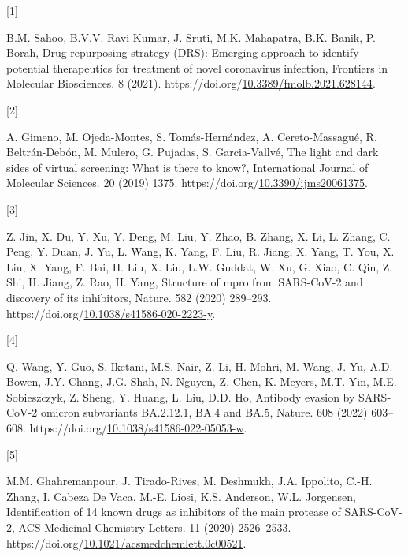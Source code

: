 \documentclass[
]{article}
\newlength{\cslhangindent}
\newlength{\csllabelwidth}
\newlength{\cslentryspacingunit} %
\newenvironment{CSLReferences}[2] %
 {%
  \setlength{\parindent}{0pt}
  \ifodd #1
  \let\oldpar\par
  \def\par{\hangindent=\cslhangindent\oldpar}
  \fi
  \setlength{\parskip}{#2\cslentryspacingunit}
 }%
 {}
\newcommand{\CSLLeftMargin}[1]{\parbox[t]{\csllabelwidth}{#1}}
\newcommand{\CSLRightInline}[1]{\parbox[t]{\linewidth - \csllabelwidth}{#1}\break}
\begin{document}
\hypertarget{refs}{}
\begin{CSLReferences}{0}{0}
\leavevmode{}%
\CSLLeftMargin{{[}1{]} }%
\CSLRightInline{B.M. Sahoo, B.V.V. Ravi Kumar, J. Sruti, M.K. Mahapatra,
B.K. Banik, P. Borah, Drug repurposing strategy (DRS): Emerging approach
to identify potential therapeutics for treatment of novel coronavirus
infection, Frontiers in Molecular Biosciences. 8 (2021).
https://doi.org/\href{https://doi.org/10.3389/fmolb.2021.628144}{10.3389/fmolb.2021.628144}.}

\leavevmode{}%
\CSLLeftMargin{{[}2{]} }%
\CSLRightInline{A. Gimeno, M. Ojeda-Montes, S. Tomás-Hernández, A.
Cereto-Massagué, R. Beltrán-Debón, M. Mulero, G. Pujadas, S.
Garcia-Vallvé, The light and dark sides of virtual screening: What is
there to know?, International Journal of Molecular Sciences. 20 (2019)
1375.
https://doi.org/\href{https://doi.org/10.3390/ijms20061375}{10.3390/ijms20061375}.}

\leavevmode{}%
\CSLLeftMargin{{[}3{]} }%
\CSLRightInline{Z. Jin, X. Du, Y. Xu, Y. Deng, M. Liu, Y. Zhao, B.
Zhang, X. Li, L. Zhang, C. Peng, Y. Duan, J. Yu, L. Wang, K. Yang, F.
Liu, R. Jiang, X. Yang, T. You, X. Liu, X. Yang, F. Bai, H. Liu, X. Liu,
L.W. Guddat, W. Xu, G. Xiao, C. Qin, Z. Shi, H. Jiang, Z. Rao, H. Yang,
Structure of mpro from SARS-CoV-2 and discovery of its inhibitors,
Nature. 582 (2020) 289--293.
https://doi.org/\href{https://doi.org/10.1038/s41586-020-2223-y}{10.1038/s41586-020-2223-y}.}

\leavevmode{}%
\CSLLeftMargin{{[}4{]} }%
\CSLRightInline{Q. Wang, Y. Guo, S. Iketani, M.S. Nair, Z. Li, H. Mohri,
M. Wang, J. Yu, A.D. Bowen, J.Y. Chang, J.G. Shah, N. Nguyen, Z. Chen,
K. Meyers, M.T. Yin, M.E. Sobieszczyk, Z. Sheng, Y. Huang, L. Liu, D.D.
Ho, Antibody evasion by SARS-CoV-2 omicron subvariants BA.2.12.1, BA.4
and BA.5, Nature. 608 (2022) 603--608.
https://doi.org/\href{https://doi.org/10.1038/s41586-022-05053-w}{10.1038/s41586-022-05053-w}.}

\leavevmode{}%
\CSLLeftMargin{{[}5{]} }%
\CSLRightInline{M.M. Ghahremanpour, J. Tirado-Rives, M. Deshmukh, J.A.
Ippolito, C.-H. Zhang, I. Cabeza De Vaca, M.-E. Liosi, K.S. Anderson,
W.L. Jorgensen, Identification of 14 known drugs as inhibitors of the
main protease of SARS-CoV-2, ACS Medicinal Chemistry Letters. 11 (2020)
2526--2533.
https://doi.org/\href{https://doi.org/10.1021/acsmedchemlett.0c00521}{10.1021/acsmedchemlett.0c00521}.}


\end{CSLReferences}
\end{document}
